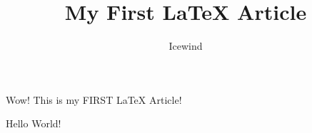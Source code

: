 \documentclass{article}
\author{Icewind}
\title{My First \LaTeX{} Article}
\begin{document}
\maketitle
Wow! This is my FIRST \LaTeX{} Article!

Hello World!
\end{document}

